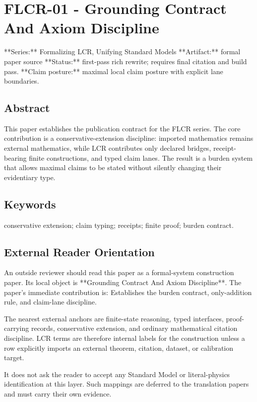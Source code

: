 \documentclass[11pt]{article}
\begin{document}
\section*{FLCR-01 - Grounding Contract And Axiom Discipline}

**Series:** Formalizing LCR, Unifying Standard Models
**Artifact:** formal paper source
**Status:** first-pass rich rewrite; requires final citation and build pass.
**Claim posture:** maximal local claim posture with explicit lane boundaries.

\subsection*{Abstract}

This paper establishes the publication contract for the FLCR series. The core contribution is a conservative-extension discipline: imported mathematics remains external mathematics, while LCR contributes only declared bridges, receipt-bearing finite constructions, and typed claim lanes. The result is a burden system that allows maximal claims to be stated without silently changing their evidentiary type.

\subsection*{Keywords}

conservative extension; claim typing; receipts; finite proof; burden contract.

\subsection*{External Reader Orientation}

An outside reviewer should read this paper as a formal-system construction paper. Its local object is **Grounding Contract And Axiom Discipline**. The paper's immediate contribution is: Establishes the burden contract, only-addition rule, and claim-lane discipline.

The nearest external anchors are finite-state reasoning, typed interfaces, proof-carrying records, conservative extension, and ordinary mathematical citation discipline. LCR terms are therefore internal labels for the construction unless a row explicitly imports an external theorem, citation, dataset, or calibration target.

It does not ask the reader to accept any Standard Model or literal-physics identification at this layer. Such mappings are deferred to the translation papers and must carry their own evidence.
\end{document}
